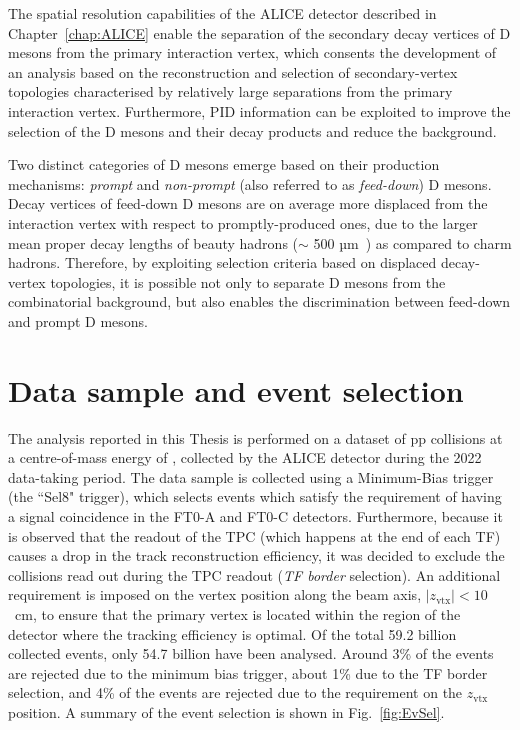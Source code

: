 The spatial resolution capabilities of the ALICE detector described in Chapter~\ref{chap:ALICE} enable the separation of the secondary decay vertices of D mesons from the primary interaction vertex, which consents the development of an analysis based on the reconstruction and selection of secondary-vertex topologies characterised by relatively large separations from the primary interaction vertex. Furthermore, PID information can be exploited to improve the selection of the D mesons and their decay products and reduce the background.

Two distinct categories of D mesons emerge based on their production mechanisms: \emph{prompt} and \emph{non-prompt} (also referred to as \emph{feed-down}) D mesons. Decay vertices of feed-down D mesons are on average more displaced from the interaction vertex with respect to promptly-produced ones, due to the larger mean proper decay lengths of beauty hadrons (\ct $\sim$ 500 µm~\cite{pdg}) as compared to charm hadrons. Therefore, by exploiting selection criteria based on displaced decay-vertex topologies, it is possible not only to separate D mesons from the combinatorial background, but also enables the discrimination between feed-down and prompt D mesons.

\section{Data sample and event selection}
The analysis reported in this Thesis is performed on a dataset of pp collisions at a centre-of-mass energy of \thirteen, collected by the ALICE detector during the 2022 data-taking period. The data sample is collected using a Minimum-Bias trigger (the ``Sel8" trigger), which selects events which satisfy the requirement of having a signal coincidence in the FT0-A and FT0-C detectors. Furthermore, because it is observed that the readout of the TPC (which happens at the end of each TF) causes a drop in the track reconstruction efficiency, it was decided to exclude the collisions read out during the TPC readout (\emph{TF border} selection). An additional requirement is imposed on the vertex position along the beam axis, $\lvert z_{\mathrm{vtx}}\rvert<10$~cm, to ensure that the primary vertex is located within the region of the detector where the tracking efficiency is optimal. Of the total 59.2 billion collected events, only 54.7 billion have been analysed. Around 3\% of the events are rejected due to the minimum bias trigger, about 1\% due to the TF border selection, and 4\% of the events are rejected due to the requirement on the $z_{\mathrm{vtx}}$ position. A summary of the event selection is shown in Fig.~\ref{fig:EvSel}.


